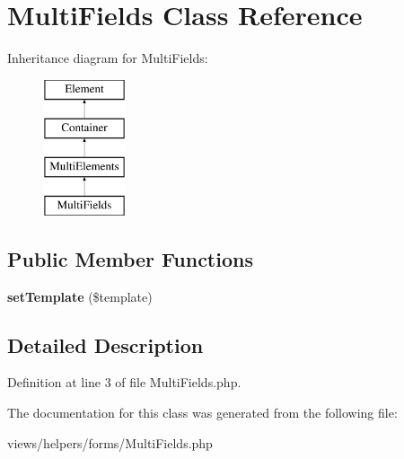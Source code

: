 \hypertarget{class_multi_fields}{
\section{MultiFields Class Reference}
\label{class_multi_fields}
}
Inheritance diagram for MultiFields:\begin{figure}[H]
\begin{center}
\leavevmode
\includegraphics[height=4.000000cm]{class_multi_fields}
\end{center}
\end{figure}
\subsection*{Public Member Functions}
\begin{DoxyCompactItemize}
\item 
\hypertarget{class_multi_fields_ade42e8bd09cd1a7785b8972b54fd7934}{
{\bfseries setTemplate} (\$template)}
\label{class_multi_fields_ade42e8bd09cd1a7785b8972b54fd7934}

\end{DoxyCompactItemize}


\subsection{Detailed Description}


Definition at line 3 of file MultiFields.php.



The documentation for this class was generated from the following file:\begin{DoxyCompactItemize}
\item 
views/helpers/forms/MultiFields.php\end{DoxyCompactItemize}
